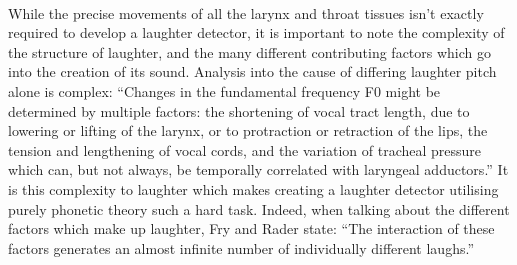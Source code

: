 \documentclass[a4paper,11pt,notitlepage]{article}
\begin{document}
\\
While the precise movements of all the larynx and throat tissues isn't exactly required to develop a laughter detector, it is important to note the complexity of the structure of laughter, and the many different contributing factors which go into the creation of its sound. Analysis into the cause of differing laughter pitch alone is complex: ``Changes in the fundamental frequency F0 might be determined by multiple factors: the shortening of vocal tract length, due to lowering or lifting of the larynx, or to protraction or retraction of the lips, the tension and lengthening of vocal cords, and the variation of tracheal pressure which can, but not always, be temporally correlated with laryngeal adductors.''\cite{cosentino2016quantitative} It is this complexity to laughter which makes creating a laughter detector utilising purely phonetic theory such a hard task. Indeed, when talking about the different factors which make up laughter, Fry and Rader state: ``The interaction of these factors generates an almost infinite number of individually different laughs.''\cite{fry1977respiratory}
\end{document}
